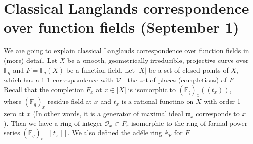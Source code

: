 \newpage
\section{Classical Langlands correspondence over function fields (September 1)}


We are going to explain classical Langlands correspondence over function fields in (more) detail.
Let $X$ be a smooth, geometrically irreducible, projective curve over $\mathbb{F}_{q}$ and $F = \mathbb{F}_{q}(X)$ be a function field.
Let $|X|$ be a set of closed points of $X$, which has a 1-1 correspondence with $\mathscr{V}$ - the set of
places (completions) of $F$.
Recall that the completion $F_{x}$ at $x \in |X|$ is isomorphic to $(\mathbb{F}_{q})_{x}((t_{x}))$, where 
$(\mathbb{F}_{q})_{x}$ residue field at $x$ and $t_{x}$ is a rational functino on $X$ with order 1 zero at $x$
(In other words, it is a generator of maximal ideal $\mathfrak{m}_{x}$ corresponds to $x$).
Then we have a ring of integer $\mathcal{O}_{x} \subset F_{x}$ isomorphic to the ring of
formal power series $(\mathbb{F}_{q})_{x}[[t_{x}]]$.
We also defined the ad\'ele ring $\mathbb{A}_{F}$ for $F$.

